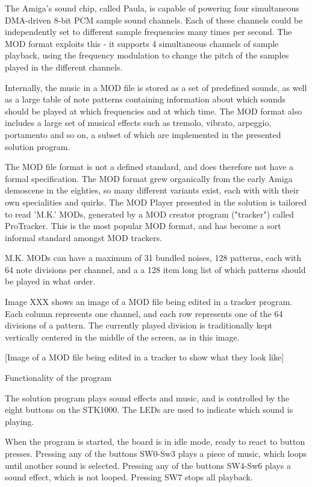 The Amiga's sound chip, called Paula, is capable of powering four simultaneous DMA-driven 8-bit PCM sample sound channels.
Each of these channels could be independently set to different sample frequencies many times per second.
The MOD format exploits this - it supports 4 simultaneous channels of sample playback, using the frequency modulation to change the pitch of the samples played in the different channels.

Internally, the music in a MOD file is stored as a set of predefined sounds, as well as a large table of note patterns containing information about which sounds should be played at which frequencies and at which time.
The MOD format also includes a large set of musical effects such as tremolo, vibrato, arpeggio, portamento and so on, a subset of which are implemented in the presented solution program.

The MOD file format is not a defined standard, and does therefore not have a formal specification.
The MOD format grew organically from the early Amiga demoscene in the eighties, so many different variants exist, each with with their own specialities and quirks.
The MOD Player presented in the solution is tailored to read 'M.K.' MODs, generated by a MOD creator program ("tracker") called ProTracker.
This is the most popular MOD format, and has become a sort informal standard amongst MOD trackers.

M.K. MODs can have a maximum of 31 bundled noises, 128 patterns, each with 64 note divisions per channel, and a a 128 item long list of which patterns should be played in what order.

Image XXX shows an image of a MOD file being edited in a tracker program.
Each column represents one channel, and each row represents one of the 64 divisions of a pattern.
The currently played division is traditionally kept vertically centered in the middle of the screen, as in this image.

[Image of a MOD file being edited in a tracker to show what they look like]






Functionality of the program

The solution program plays sound effects and music, and is controlled by the eight buttons on the STK1000.
The LEDs are used to indicate which sound is playing.

When the program is started, the board is in idle mode, ready to react to button presses.
Pressing any of the buttons SW0-Sw3 plays a piece of music, which loops until another sound is selected.
Pressing any of the buttons SW4-Sw6 plays a sound effect, which is not looped.
Pressing SW7 stops all playback.

